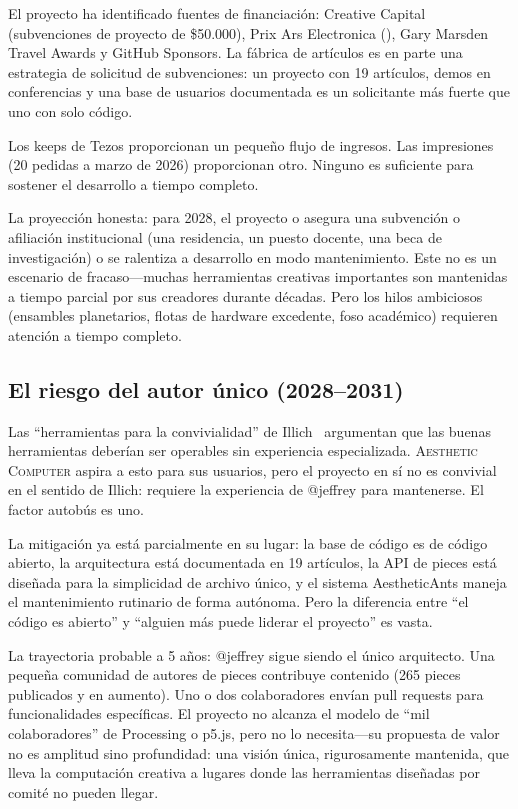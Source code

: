 \documentclass[10pt,letterpaper,twocolumn]{article}
\newcommand{\ac}{\textsc{Aesthetic Computer}}
\begin{document}
El proyecto ha identificado fuentes de financiación: Creative Capital (subvenciones de proyecto de \$50.000), Prix Ars Electronica (), Gary Marsden Travel Awards y GitHub Sponsors. La fábrica de artículos es en parte una estrategia de solicitud de subvenciones: un proyecto con 19 artículos, demos en conferencias y una base de usuarios documentada es un solicitante más fuerte que uno con solo código.

Los keeps de Tezos proporcionan un pequeño flujo de ingresos. Las impresiones (20 pedidas a marzo de 2026) proporcionan otro. Ninguno es suficiente para sostener el desarrollo a tiempo completo.

La proyección honesta: para 2028, el proyecto o asegura una subvención o afiliación institucional (una residencia, un puesto docente, una beca de investigación) o se ralentiza a desarrollo en modo mantenimiento. Este no es un escenario de fracaso---muchas herramientas creativas importantes son mantenidas a tiempo parcial por sus creadores durante décadas. Pero los hilos ambiciosos (ensambles planetarios, flotas de hardware excedente, foso académico) requieren atención a tiempo completo.

\subsection{El riesgo del autor único (2028--2031)}

Las ``herramientas para la convivialidad'' de Illich~\citep{illich1973tools} argumentan que las buenas herramientas deberían ser operables sin experiencia especializada. \ac{} aspira a esto para sus usuarios, pero el proyecto en sí no es convivial en el sentido de Illich: requiere la experiencia de @jeffrey para mantenerse. El factor autobús es uno.

La mitigación ya está parcialmente en su lugar: la base de código es de código abierto, la arquitectura está documentada en 19 artículos, la API de pieces está diseñada para la simplicidad de archivo único, y el sistema AestheticAnts maneja el mantenimiento rutinario de forma autónoma. Pero la diferencia entre ``el código es abierto'' y ``alguien más puede liderar el proyecto'' es vasta.

La trayectoria probable a 5 años: @jeffrey sigue siendo el único arquitecto. Una pequeña comunidad de autores de pieces contribuye contenido (265 pieces publicados y en aumento). Uno o dos colaboradores envían pull requests para funcionalidades específicas. El proyecto no alcanza el modelo de ``mil colaboradores'' de Processing o p5.js, pero no lo necesita---su propuesta de valor no es amplitud sino profundidad: una visión única, rigurosamente mantenida, que lleva la computación creativa a lugares donde las herramientas diseñadas por comité no pueden llegar.
\end{document}
